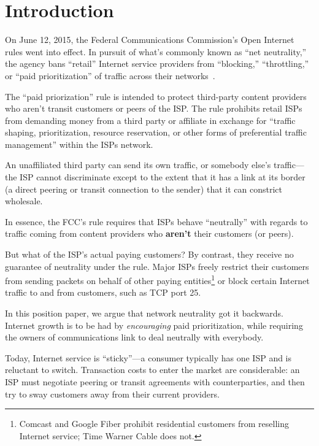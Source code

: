\section{Introduction}

\label{sec:intro}

On June 12, 2015, the Federal Communications Commission's Open
Internet rules went into effect. In pursuit of what's commonly known
as ``net neutrality,'' the agency bans ``retail'' Internet service
providers from ``blocking,'' ``throttling,'' or ``paid
prioritization'' of traffic across their networks~\cite{openinternet}.

The ``paid priorization'' rule is intended to protect third-party
content providers who aren't transit customers or peers of the
ISP. The rule prohibits retail ISPs from demanding money from a third
party or affiliate in exchange for ``traffic shaping, prioritization,
resource reservation, or other forms of preferential traffic
management'' within the ISPs network.

An unaffiliated third party can send its own traffic, or somebody
else's traffic---the ISP cannot discriminate except to the extent that
it has a link at its border (a direct peering or transit connection to
the sender) that it can constrict wholesale.

In essence, the FCC's rule requires that ISPs behave ``neutrally''
with regards to traffic coming from content providers who
\textbf{aren't} their customers (or peers).

But what of the ISP's actual paying customers? By contrast, they
receive no guarantee of neutrality under the rule. Major ISPs freely
restrict their customers from sending packets on behalf of other
paying entities\footnote{Comcast and Google Fiber prohibit residential
  customers from reselling Internet service; Time Warner Cable does
  not.} or block certain Internet traffic to and from
customers, such as TCP port 25.

In this position paper, we argue that network neutrality got it
backwards. Internet growth is to be had by \emph{encouraging} paid
prioritization, while requiring the owners of communications link to
deal neutrally with everybody.

Today, Internet service is ``sticky''---a consumer typically has one
ISP and is reluctant to switch. Transaction costs to enter the market
are considerable: an ISP must negotiate peering or transit agreements
with counterparties, and then try to sway customers away from
their current providers.

